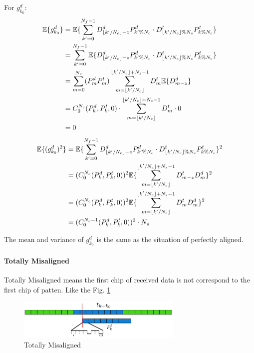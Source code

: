\documentclass[a4paper]{article}
\DeclarePairedDelimiter\floor{\lfloor}{\rfloor}
\begin{document}
For $g^d_{k_0}$: \label{eq:chip-level aligned-data}
\begin{align}
	\mathbb{E} \{g^d_{k_0}\} 
	&= \mathbb{E} \{\sum_{k'=0}^{N_f-1} D^d_{\floor{k'/N_c}-z} P^d_{k'\%N_c} \cdot D^t_{\floor{k'/N_c}\%N_s} P^t_{k\%N_c} \}\\
	&= \sum_{k'=0}^{N_f-1} \mathbb{E} \{ D^d_{\floor{k'/N_c}-z} P^d_{k'\%N_c} \cdot D^t_{\floor{k'/N_c}\%N_s} P^t_{k\%N_c} \}\\
	&= \sum_{m = 0}^{N_c} (P^d_{m} P^t_{m}) \sum_{m = \floor{k'/N_c}}^{\floor{k'/N_c}+N_s-1} D^t_{m} \mathbb{E}\{ D^d_{m-z} \}\\
	&= C_0^{N_c}(P_k^d, P_k^t, 0) \cdot \sum_{m = \floor{k'/N_c}}^{\floor{k'/N_c}+N_s-1} D^t_{m} \cdot0\\
	&= 0
\end{align}
\begin{align}
	\mathbb{E} \{(g^d_{k_0})^2\}
	&= \mathbb{E} \{\sum_{k'=0}^{N_f-1} D^d_{\floor{k'/N_c}-z} P^d_{k'\%N_c} \cdot D^t_{\floor{k'/N_c}\%N_s} P^t_{k\%N_c} \}^2\\
	&= (C_0^{N_c}(P_k^d, P_k^t, 0))^2 \mathbb{E}\{\sum_{m = \floor{k'/N_c}}^{\floor{k'/N_c}+N_s-1} D_{m-z}^t D_{m}^d \}^2\\
	&= (C_0^{N_c}(P_k^d, P_k^t, 0))^2 \mathbb{E}\{\sum_{m = \floor{k'/N_c}}^{\floor{k'/N_c}+N_s-1} D_{m}^t D_{m}^d \}^2\\
	&= (C_0^{N_c-1}(P^d_{k}, P^t_{k}, 0))^2 \cdot N_s
\end{align}

The mean and variance of $g^d_{k_0}$ is the same as the situation of perfectly aligned.

\paragraph{Totally Misaligned} %
\label{par:totally_misaligned}
Totally Misaligned means the first chip of received data is not correspond to the first chip of patten. Like the Fig. \ref{fig:Totally Misaligned}
\begin{figure}[ht]
	\centering
	\includegraphics[width = 3.1in]{figure/totally_misaligned.png}
	\caption{Totally Misaligned}
	\label{fig:Totally Misaligned}
\end{figure}
\end{document}
